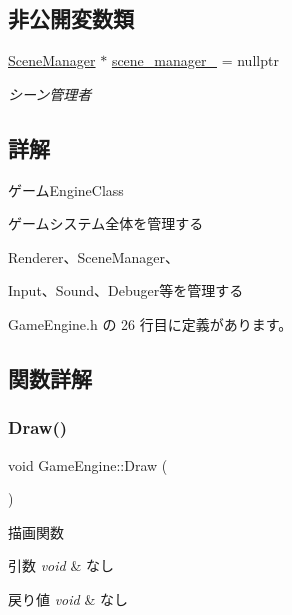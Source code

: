 \subsection*{非公開変数類}
\begin{DoxyCompactItemize}
\item 
\mbox{\hyperlink{class_scene_manager}{Scene\+Manager}} $\ast$ \mbox{\hyperlink{class_game_engine_a8c1636cb4ace62abebc9c0aa9cb18b1b}{scene\+\_\+manager\+\_\+}} = nullptr
\begin{DoxyCompactList}\small\item\em シーン管理者 \end{DoxyCompactList}\end{DoxyCompactItemize}


\subsection{詳解}
ゲーム\+Engine\+Class 

ゲームシステム全体を管理する

Renderer、\+Scene\+Manager、

Input、\+Sound、\+Debuger等を管理する 

 Game\+Engine.\+h の 26 行目に定義があります。



\subsection{関数詳解}
\mbox{\label{class_game_engine_a259a60d31a1ebd408b4c29b06575d688}} 
\subsubsection{\texorpdfstring{Draw()}{Draw()}}
{\footnotesize\ttfamily void Game\+Engine\+::\+Draw (\begin{DoxyParamCaption}{ }\end{DoxyParamCaption})}



描画関数 


\begin{DoxyParams}{引数}
{\em void} & なし \\
\hline
\end{DoxyParams}

\begin{DoxyRetVals}{戻り値}
{\em void} & なし \\
\hline
\end{DoxyRetVals}


